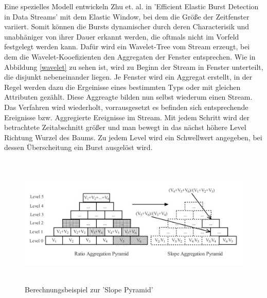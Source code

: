 Eine spezielles Modell entwickeln Zhu et. al. in 'Efficient Elastic Burst Detection in Data Streams' \cite{Zhu:2003:EEB:956750.956789} mit dem Elastic Window, bei dem   die Größe der Zeitfenster variiert. Somit können die Bursts dynamischer durch deren Characterisik und unabhäniger von ihrer Dauer erkannt werden, die oftmals nicht im Vorfeld festgelegt werden kann. Dafür wird ein Wavelet-Tree vom Stream erzeugt, bei dem die Wavelet-Kooefizienten den Aggregaten der Fenster entsprechen. Wie in Abbildung \ref{wavelet} zu sehen ist, wird zu Beginn der Stream in Fenster unterteilt, die disjunkt nebeneinander liegen. Je Fenster wird ein Aggregat erstellt, in der Regel werden dazu die Ergeinisse eines bestimmten Typs oder mit gleichen Attributen gezählt. Diese Aggreagte bilden nun selbst wiederum einen Stream. Das Verfahren wird wiederholt, vorrausgesetzt es befinden sich entsprechende Ereignisse bzw. Aggregierte Ereignisse im Stream. Mit jedem Schritt wird der betrachtete Zeitabschnitt größer und man bewegt in das nächst höhere Level Richtung Wurzel des Baums. Zu jedem Level wird ein Schwellwert angegeben, bei dessen Überscheitung ein Burst ausgelöst wird.

\begin{figure}[htbp]
\centerline{\includegraphics[height=6.3cm]{images/slopepyramid.jpg}}
\caption{Berechnungsbeispiel zur 'Slope Pyramid' \cite{yuan2007online}}
\label{fig:slopepyramid}
\end{figure}




